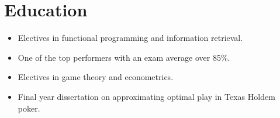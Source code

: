 \documentclass[12pt,a4paper,sans]{moderncv}
\begin{document}
\section{Education}

\vspace{0.5em}
{
  \begin{itemize}
  \setlength\itemsep{0.5em}
  \vspace{-0.5em}
  \item
    Electives in functional programming and information retrieval.
  \item
    One of the top performers with an exam average over 85\%.
  \end{itemize}
  \vspace{0.5em}
}

\vspace{0.5em}
{
  \begin{itemize}
  \setlength\itemsep{0.5em}
  \vspace{-0.5em}
  \item
    Electives in game theory and econometrics.
  \item
    Final year dissertation on approximating optimal play in Texas Hold\textsc{}em poker.
  \end{itemize}
  \vspace{0.5em}
}
\end{document}
